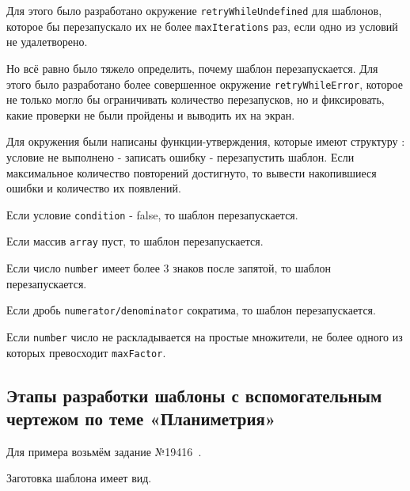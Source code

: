 Для этого было разработано окружение \texttt{retryWhileUndefined} для шаблонов, которое бы перезапускало их не более \texttt{maxIterations} раз, если одно из условий не удалетворено. 


Но всё равно было тяжело определить, почему шаблон перезапускается. Для этого было разработано более совершенное окружение \texttt{retryWhileError}, которое не только могло бы ограничивать количество перезапусков, но и фиксировать, какие проверки не были пройдены и выводить их на экран.


Для окружения были написаны функции-утверждения, которые имеют структуру : условие не выполнено - записать ошибку - перезапустить шаблон. Если максимальное количество повторений достигнуто, то вывести накопившиеся ошибки и количество их появлений. 

    Если условие \texttt{condition} - false, то шаблон перезапускается. 

    Если массив \texttt{array} пуст, то шаблон перезапускается.

    Если число \texttt{number} имеет более 3 знаков после запятой, то шаблон перезапускается.
    
    Если дробь \texttt{numerator/denominator} сократима, то шаблон перезапускается.

    Если \texttt{number} число не раскладывается на простые множители, не более одного из которых превосходит \texttt{maxFactor}.

\subsection{Этапы разработки шаблоны с вспомогательным чертежом по теме «Планиметрия»}

Для примера возьмём задание №19416~\cite{egemath}.

Заготовка шаблона имеет вид.



